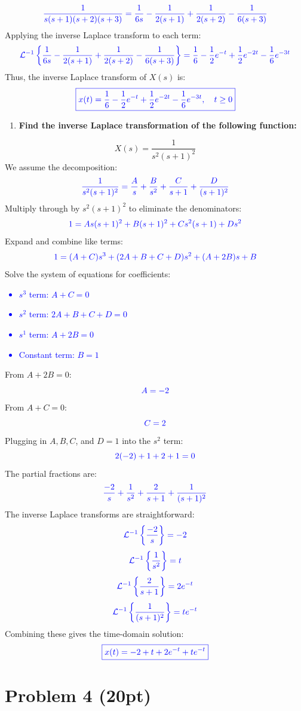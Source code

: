 \documentclass{article}
\begin{document}
\[
	\textcolor{blue}{\frac{1}{s(s+1)(s+2)(s+3)} = \frac{1}{6s} - \frac{1}{2(s+1)} + \frac{1}{2(s+2)} - \frac{1}{6(s+3)}}
\]
Applying the inverse Laplace transform to each term:
\[
	\textcolor{blue}{\mathcal{L}^{-1}\left\{\frac{1}{6s} - \frac{1}{2(s+1)} + \frac{1}{2(s+2)} - \frac{1}{6(s+3)}\right\} = \frac{1}{6} - \frac{1}{2}e^{-t} + \frac{1}{2}e^{-2t} - \frac{1}{6}e^{-3t}}
\]
Thus, the inverse Laplace transform of \( X(s) \) is:
\[
	\textcolor{blue}{\boxed{x(t) = \frac{1}{6} - \frac{1}{2}e^{-t} + \frac{1}{2}e^{-2t} - \frac{1}{6}e^{-3t}, \quad t \geq 0}}
\]
\newpage
\begin{enumerate}
	\item[(b)] \textbf{Find the inverse Laplace transformation of the following function:}
\end{enumerate}
\[
	X(s) = \frac{1}{s^2(s+1)^2}
\]
We assume the decomposition:
\[
	\textcolor{blue}{\frac{1}{s^2 (s + 1)^2} = \frac{A}{s} + \frac{B}{s^2} + \frac{C}{s+1} + \frac{D}{(s+1)^2}}
\]
Multiply through by \(s^2 (s + 1)^2\) to eliminate the denominators:
\[
	\textcolor{blue}{1 = A s (s + 1)^2 + B (s + 1)^2 + C s^2 (s + 1) + D s^2}
\]
Expand and combine like terms:
\[
	\textcolor{blue}{1 = (A + C)s^3 + (2A + B + C + D)s^2 + (A + 2B)s + B}
\]
Solve the system of equations for coefficients:
\textcolor{blue}{\begin{itemize}
	\item \(s^3\) term: \(A + C = 0\)
	\item \(s^2\) term: \(2A + B + C + D = 0\)
	\item \(s^1\) term: \(A + 2B = 0\)
	\item Constant term: \(B = 1\)
	\end{itemize}}
From \(A + 2B = 0\):
\[
	\textcolor{blue}{A = -2}
\]
From \(A + C = 0\):
\[
	\textcolor{blue}{C = 2}
\]
Plugging in \(A, B, C\), and \(D = 1\) into the \(s^2\) term:
\[
	\textcolor{blue}{2(-2) + 1 + 2 + 1 = 0}
\]
The partial fractions are:
\[
	\textcolor{blue}{\frac{-2}{s} + \frac{1}{s^2} + \frac{2}{s+1} + \frac{1}{(s+1)^2}}
\]
The inverse Laplace transforms are straightforward:
\[
	\textcolor{blue}{\mathcal{L}^{-1}\left\{\frac{-2}{s}\right\} = -2}
\]
\[
	\textcolor{blue}{\mathcal{L}^{-1}\left\{\frac{1}{s^2}\right\} = t}
\]
\[
	\textcolor{blue}{\mathcal{L}^{-1}\left\{\frac{2}{s+1}\right\} = 2e^{-t}}
\]
\[
	\textcolor{blue}{\mathcal{L}^{-1}\left\{\frac{1}{(s+1)^2}\right\} = te^{-t}}
\]
Combining these gives the time-domain solution:
\[
	\textcolor{blue}{\boxed{x(t) = -2 + t + 2e^{-t} + te^{-t}}}
\]
\newpage
\section*{Problem 4 (20pt)}
\end{document}
